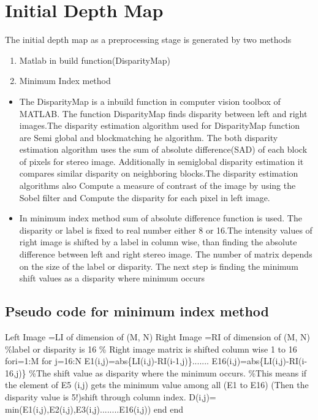 \section{Initial Depth Map}
The initial depth map   as a preprocessing  stage  is generated by two methods
\begin{enumerate}
  \item Matlab in build function(DisparityMap)
  \item Minimum Index method
\end{enumerate}
\begin{itemize}
  \item The   DisparityMap  is a  inbuild function in computer vision toolbox of MATLAB. The function DisparityMap finds  disparity  between left and right images.\newline The disparity estimation algorithm used  for DisparityMap function are Semi global and blockmatching he  algorithm. The both disparity estimation algorithm uses the sum of absolute difference(SAD) of each block of pixels  for stereo image. Additionally  in semiglobal disparity estimation it compares similar  disparity on neighboring blocks.\newline The disparity estimation algorithms  also Compute a measure of contrast of the image by using the Sobel filter and Compute the disparity for each pixel in left image.
  \item In minimum index method sum of absolute difference function is used. The disparity or label is fixed to real number either 8 or 16.\newline The intensity values of right image is shifted by a label in column wise, than finding the absolute difference between left and right stereo image. \newline The number of matrix depends on the size of the label or disparity. The next step is finding the minimum shift values as a disparity where minimum occurs
\end{itemize}
\subsection{ Pseudo code for minimum index method}
Left Image =LI of dimension of (M, N)
\newline Right Image =RI of dimension of (M, N)
\newline \%label or disparity is 16
\newline \% Right image matrix is shifted column wise 1 to 16
\newline fori=1:M
\newline for j=16:N     %
\newline E1(i,j)=abs\{LI(i,j)-RI(i-1,j)\}....... E16(i,j)=abs\{LI(i,j)-RI(i-16,j)\}
\newline \%The shift value as disparity where the minimum occurs.
\newline \%This means if the element of E5 (i,j) gets the minimum value among all (E1 to E16) (Then the disparity value is 5!)shift through column index.
\newline D(i,j)= min{(E1(i,j),E2(i,j),E3(i,j)........E16(i,j))} \newline end \newline end
